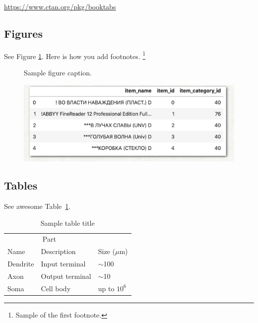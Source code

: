\documentclass{article}
\begin{document}
\begin{center}
  \url{https://www.ctan.org/pkg/booktabs}
\end{center}


\subsection{Figures}
\lipsum[10]
See Figure \ref{fig:fig1}. Here is how you add footnotes. \footnote{Sample of the first footnote.}
\lipsum[11]

\begin{figure}
  \centering
  \fbox{\rule[-.5cm]{4cm}{4cm} \rule[-.5cm]{4cm}{0cm}}
  \caption{Sample figure caption.}
  \label{fig:fig1}
\end{figure}

\begin{figure} %
    \centering
    \includegraphics{test.png}
\end{figure}

\subsection{Tables}
\lipsum[12]
See awesome Table~\ref{tab:table}.

\begin{table}
 \caption{Sample table title}
  \centering
  \begin{tabular}{lll}
    \toprule
    \multicolumn{2}{c}{Part}                   \\
    \cmidrule(r){1-2}
    Name     & Description     & Size ($\mu$m) \\
    \midrule
    Dendrite & Input terminal  & $\sim$100     \\
    Axon     & Output terminal & $\sim$10      \\
    Soma     & Cell body       & up to $10^6$  \\
    \bottomrule
  \end{tabular}
  \label{tab:table}
\end{table}
\end{document}

